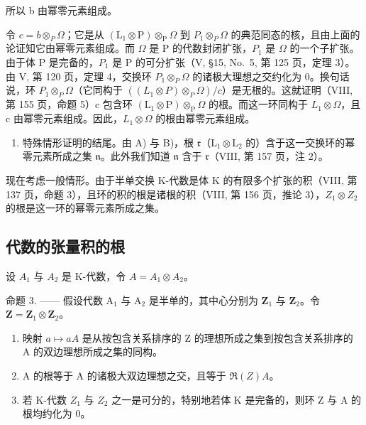 所以 b 由幂零元素组成。

令 \(c = b \otimes_{P} \Omega\)；它是从 \((\mathrm{L}_{1} \otimes \mathrm{P}) \otimes_{\mathrm{P}} \Omega\) 到 \(P_{1} \otimes_{P} \Omega\) 的典范同态的核，且由上面的论证知它由幂零元素组成。而 \(\Omega\) 是 P 的代数封闭扩张，\(P_{1}\) 是 \(\Omega\) 的一个子扩张。由于体 P 是完备的，\(P_{1}\) 是 P 的可分扩张（V, §15, No.~5, 第 125 页，定理 3）。由 V, 第 120 页，定理 4，交换环 \(P_{1} \otimes_{P} \Omega\) 的诸极大理想之交约化为 0。换句话说，环 \(P_{1} \otimes_{P} \Omega\)（它同构于 \(((L_{1} \otimes P) \otimes_{P} \Omega)/c\)）是无根的。这就证明（VIII, 第 155 页，命题 5）c 包含环 \((\mathrm{L}_{1} \otimes \mathrm{P}) \otimes_{\mathrm{P}} \Omega\) 的根。而这一环同构于 \(L_{1} \otimes \Omega\)，且 c 由幂零元素组成。因此，\(L_{1} \otimes \Omega\) 的根由幂零元素组成。

\begin{enumerate}
\def\labelenumi{\Alph{enumi})}
\setcounter{enumi}{2}
\tightlist
\item
  特殊情形证明的结尾。由 A) 与 B)，根 \(\mathfrak{r}\)（\(\mathrm{L}_1\otimes \mathrm{L}_2\) 的）含于这一交换环的幂零元素所成之集 \(\mathfrak{n}\)。此外我们知道 \(\mathfrak{n}\) 含于 \(\mathfrak{r}\)（VIII, 第 157 页，注 2）。
\end{enumerate}

现在考虑一般情形。由于半单交换 K-代数是体 K 的有限多个扩张的积（VIII, 第 137 页，命题 3），且环的积的根是诸根的积（VIII, 第 156 页，推论 3），\(Z_{1} \otimes Z_{2}\) 的根是这一环的幂零元素所成之集。

\subsection{代数的张量积的根}

设 \(A_{1}\) 与 \(A_{2}\) 是 K-代数，令 \(A = A_{1} \otimes A_{2}\)。

命题 3. —— 假设代数 \(\mathrm{A}_1\) 与 \(\mathrm{A}_2\) 是半单的，其中心分别为 \(\mathbf{Z}_1\) 与 \(\mathbf{Z}_2\)。令 \(\mathbf{Z} = \mathbf{Z}_1 \otimes \mathbf{Z}_2\)。

\begin{enumerate}
\def\labelenumi{\alph{enumi})}
\item
  映射 \(a \mapsto aA\) 是从按包含关系排序的 Z 的理想所成之集到按包含关系排序的 A 的双边理想所成之集的同构。
\item
  A 的根等于 A 的诸极大双边理想之交，且等于 \(\Re(Z)A\)。
\item
  若 K-代数 \(Z_{1}\) 与 \(Z_{2}\) 之一是可分的，特别地若体 K 是完备的，则环 Z 与 A 的根均约化为 0。
\end{enumerate}

